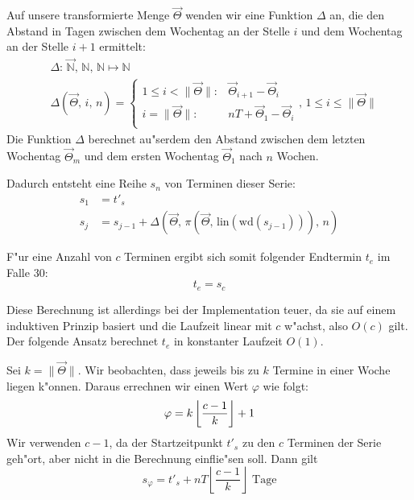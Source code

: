 \documentclass[a4paper]{article}
\newcommand*{\wdf}{\mathrm{wd}}
\newcommand*{\linf}{\mathrm{lin}}
\numberwithin{equation}{section}
\begin{document}
\noindent Auf unsere transformierte Menge $\vec{\Theta}$ wenden wir eine
Funktion $\Delta$ an, die den Abstand in Tagen zwischen dem Wochentag an der
Stelle $i$ und dem Wochentag an der Stelle $i+1$ ermittelt:
\begin{equation}
\begin{split}
  & \Delta :\, \vec{\mathbb{N}},\,\mathbb{N},\,\mathbb{N} \mapsto \mathbb{N} \\
  & \Delta(\vec{\Theta},\,i,\,n) = \left\{\begin{array}{ll}
  1 \le i < \|\vec{\Theta}\| : & \vec{\Theta}_{i+1} - \vec{\Theta}_i \\
  i = \|\vec{\Theta}\| : & nT + \vec{\Theta}_{1} - \vec{\Theta}_{i} \\
  \end{array}\right.,\,1 \le i \le \|\vec{\Theta}\|
\end{split}
\end{equation}
Die Funktion $\Delta$ berechnet au"serdem den Abstand zwischen dem letzten
Wochentag $\vec{\Theta}_m$ und dem ersten Wochentag $\vec{\Theta}_1$ nach $n$
Wochen.

\noindent Dadurch entsteht eine Reihe $s_n$ von Terminen dieser Serie:
\begin{equation}\label{eqn:computeSeries30}
\begin{split}  
  s_1 & = t'_s \\
  s_{j} & = s_{j-1} + \Delta(\vec{\Theta},\,\pi(\vec{\Theta},\,\linf(\wdf(s_{j-1}))),\,n)
\end{split}
\end{equation}

\noindent F"ur eine Anzahl von $c$ Terminen ergibt sich somit folgender
Endtermin $t_e$ im Falle 30:
\begin{equation}\label{eqn:sn300}t_e = s_c\end{equation}

\noindent Diese Berechnung ist allerdings bei der Implementation teuer, da sie
auf einem induktiven Prinzip basiert und die Laufzeit linear mit $c$ w"achst,
also $O(c)$ gilt. Der folgende Ansatz berechnet $t_e$ in konstanter Laufzeit
$O(1)$.

Sei $k = \|\vec{\Theta}\|$. Wir beobachten, dass jeweils bis zu $k$ Termine in
einer Woche liegen k"onnen. Daraus errechnen wir einen Wert $\varphi$ wie folgt:
\begin{equation}
  \varphi = k \left\lfloor\frac{c - 1}{k}\right\rfloor + 1 \\
\end{equation}
Wir verwenden $c - 1$, da der Startzeitpunkt $t'_s$ zu den $c$ Terminen der
Serie geh"ort, aber nicht in die Berechnung einflie"sen soll. Dann gilt
\begin{equation}
  s_\varphi = t'_s + nT \left\lfloor\frac{c - 1}{k}\right\rfloor\textrm{ Tage}
\end{equation}
\end{document}
